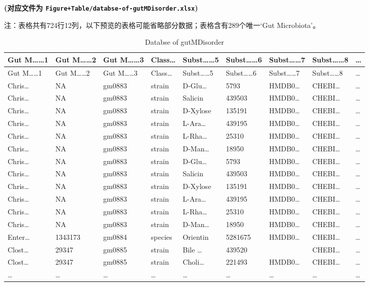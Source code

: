 \documentclass[
]{article}
\begin{document}
\textbf{(对应文件为 \texttt{Figure+Table/databse-of-gutMDisorder.xlsx})}

\begin{center}\begin{tcolorbox}[colback=gray!10, colframe=gray!50, width=0.9\linewidth, arc=1mm, boxrule=0.5pt]注：表格共有724行12列，以下预览的表格可能省略部分数据；表格含有289个唯一`Gut Microbiota'。
\end{tcolorbox}
\end{center}

\begin{longtable}[]{@{}lllllllll@{}}
\caption{\label{tab:databse-of-gutMDisorder}Databse of gutMDisorder}\tabularnewline
\toprule
Gut M\ldots\ldots1 & Gut M\ldots\ldots2 & Gut M\ldots\ldots3 & Class\ldots{} & Subst\ldots\ldots5 & Subst\ldots\ldots6 & Subst\ldots\ldots7 & Subst\ldots\ldots8 & \ldots{}\tabularnewline
\midrule
\endfirsthead
\toprule
Gut M\ldots\ldots1 & Gut M\ldots\ldots2 & Gut M\ldots\ldots3 & Class\ldots{} & Subst\ldots\ldots5 & Subst\ldots\ldots6 & Subst\ldots\ldots7 & Subst\ldots\ldots8 & \ldots{}\tabularnewline
\midrule
\endhead
Chris\ldots{} & NA & gm0883 & strain & D-Glu\ldots{} & 5793 & HMDB0\ldots{} & CHEBI\ldots{} & \ldots{}\tabularnewline
Chris\ldots{} & NA & gm0883 & strain & Salicin & 439503 & HMDB0\ldots{} & CHEBI\ldots{} & \ldots{}\tabularnewline
Chris\ldots{} & NA & gm0883 & strain & D-Xylose & 135191 & HMDB0\ldots{} & CHEBI\ldots{} & \ldots{}\tabularnewline
Chris\ldots{} & NA & gm0883 & strain & L-Ara\ldots{} & 439195 & HMDB0\ldots{} & CHEBI\ldots{} & \ldots{}\tabularnewline
Chris\ldots{} & NA & gm0883 & strain & L-Rha\ldots{} & 25310 & HMDB0\ldots{} & CHEBI\ldots{} & \ldots{}\tabularnewline
Chris\ldots{} & NA & gm0883 & strain & D-Man\ldots{} & 18950 & HMDB0\ldots{} & CHEBI\ldots{} & \ldots{}\tabularnewline
Chris\ldots{} & NA & gm0883 & strain & D-Glu\ldots{} & 5793 & HMDB0\ldots{} & CHEBI\ldots{} & \ldots{}\tabularnewline
Chris\ldots{} & NA & gm0883 & strain & Salicin & 439503 & HMDB0\ldots{} & CHEBI\ldots{} & \ldots{}\tabularnewline
Chris\ldots{} & NA & gm0883 & strain & D-Xylose & 135191 & HMDB0\ldots{} & CHEBI\ldots{} & \ldots{}\tabularnewline
Chris\ldots{} & NA & gm0883 & strain & L-Ara\ldots{} & 439195 & HMDB0\ldots{} & CHEBI\ldots{} & \ldots{}\tabularnewline
Chris\ldots{} & NA & gm0883 & strain & L-Rha\ldots{} & 25310 & HMDB0\ldots{} & CHEBI\ldots{} & \ldots{}\tabularnewline
Chris\ldots{} & NA & gm0883 & strain & D-Man\ldots{} & 18950 & HMDB0\ldots{} & CHEBI\ldots{} & \ldots{}\tabularnewline
Enter\ldots{} & 1343173 & gm0884 & species & Orientin & 5281675 & HMDB0\ldots{} & CHEBI\ldots{} & \ldots{}\tabularnewline
Clost\ldots{} & 29347 & gm0885 & strain & Bile \ldots{} & 439520 & & CHEBI\ldots{} & \ldots{}\tabularnewline
Clost\ldots{} & 29347 & gm0885 & strain & Choli\ldots{} & 221493 & HMDB0\ldots{} & CHEBI\ldots{} & \ldots{}\tabularnewline
\ldots{} & \ldots{} & \ldots{} & \ldots{} & \ldots{} & \ldots{} & \ldots{} & \ldots{} & \ldots{}\tabularnewline
\bottomrule
\end{longtable}
\end{document}
